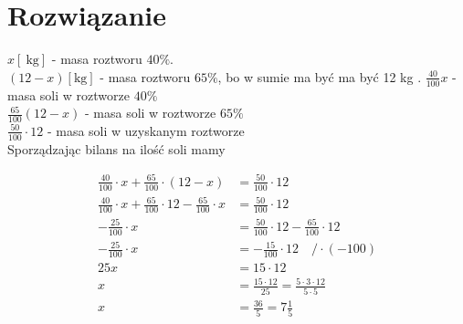 \documentclass[10pt]{article}
\begin{document}
\section*{Rozwiązanie}
\(x[\mathrm{~kg}]\) - masa roztworu \(40 \%\).\\
\((12-x)[\mathrm{kg}]\) - masa roztworu \(65 \%\), bo w sumie ma być ma być 12 kg . \(\frac{40}{100} x\) - masa soli w roztworze \(40 \%\)\\
\(\frac{65}{100}(12-x)\) - masa soli w roztworze \(65 \%\)\\
\(\frac{50}{100} \cdot 12\) - masa soli w uzyskanym roztworze\\
Sporządzając bilans na ilość soli mamy

\[
\begin{aligned}
\frac{40}{100} \cdot x+\frac{65}{100} \cdot(12-x) & =\frac{50}{100} \cdot 12 \\
\frac{40}{100} \cdot x+\frac{65}{100} \cdot 12-\frac{65}{100} \cdot x & =\frac{50}{100} \cdot 12 \\
-\frac{25}{100} \cdot x & =\frac{50}{100} \cdot 12-\frac{65}{100} \cdot 12 \\
-\frac{25}{100} \cdot x & =-\frac{15}{100} \cdot 12 \quad / \cdot(-100) \\
25 x & =15 \cdot 12 \\
x & =\frac{15 \cdot 12}{25}=\frac{5 \cdot 3 \cdot 12}{5 \cdot 5} \\
x & =\frac{36}{5}=7 \frac{1}{5}
\end{aligned}
\]
\end{document}
